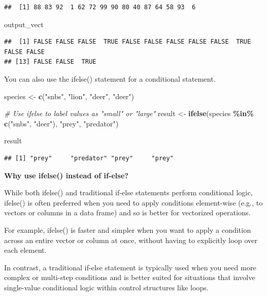 \documentclass[
]{book}
\newenvironment{Shaded}{\begin{snugshade}}{\end{snugshade}}
\newcommand{\CommentTok}[1]{\textcolor[rgb]{0.56,0.35,0.01}{\textit{#1}}}
\newcommand{\FunctionTok}[1]{\textcolor[rgb]{0.13,0.29,0.53}{\textbf{#1}}}
\newcommand{\NormalTok}[1]{#1}
\newcommand{\OtherTok}[1]{\textcolor[rgb]{0.56,0.35,0.01}{#1}}
\newcommand{\SpecialCharTok}[1]{\textcolor[rgb]{0.81,0.36,0.00}{\textbf{#1}}}
\newcommand{\StringTok}[1]{\textcolor[rgb]{0.31,0.60,0.02}{#1}}
\begin{document}
\begin{verbatim}
##  [1] 88 83 92  1 62 72 99 90 80 40 87 64 58 93  6
\end{verbatim}

\begin{Shaded}
\begin{Highlighting}[]
\NormalTok{output\_vect}
\end{Highlighting}
\end{Shaded}

\begin{verbatim}
##  [1] FALSE FALSE FALSE  TRUE FALSE FALSE FALSE FALSE FALSE  TRUE FALSE FALSE
## [13] FALSE FALSE  TRUE
\end{verbatim}

You can also use the ifelse() statement for a conditional statement.

\begin{Shaded}
\begin{Highlighting}[]
\NormalTok{species }\OtherTok{\textless{}{-}} \FunctionTok{c}\NormalTok{(}\StringTok{"snbs"}\NormalTok{, }\StringTok{"lion"}\NormalTok{, }\StringTok{"deer"}\NormalTok{, }\StringTok{"deer"}\NormalTok{)}

\CommentTok{\# Use ifelse to label values as "small" or "large"}
\NormalTok{result }\OtherTok{\textless{}{-}} \FunctionTok{ifelse}\NormalTok{(species }\SpecialCharTok{\%in\%} \FunctionTok{c}\NormalTok{(}\StringTok{"snbs"}\NormalTok{, }\StringTok{"deer"}\NormalTok{), }\StringTok{"prey"}\NormalTok{, }\StringTok{"predator"}\NormalTok{)}

\NormalTok{result}
\end{Highlighting}
\end{Shaded}

\begin{verbatim}
## [1] "prey"     "predator" "prey"     "prey"
\end{verbatim}

\textbf{Why use ifelse() instead of if-else?}

While both ifelse() and traditional if-else statements perform conditional logic, ifelse() is often preferred when you need to apply conditions element-wise (e.g., to vectors or columns in a data frame) and so is better for vectorized operations.

For example, ifelse() is faster and simpler when you want to apply a condition across an entire vector or column at once, without having to explicitly loop over each element.

In contrast, a traditional if-else statement is typically used when you need more complex or multi-step conditions and is better suited for situations that involve single-value conditional logic within control structures like loops.
\end{document}
